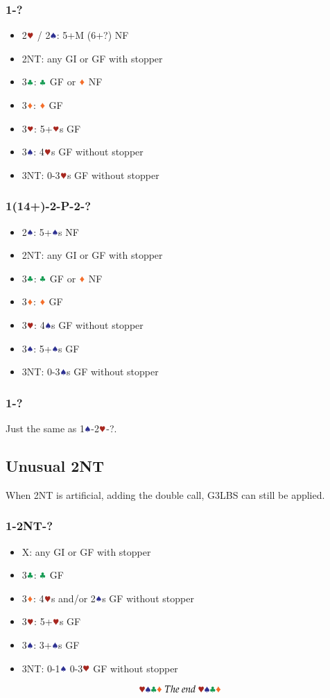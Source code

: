 \documentclass{article}
\begin{document}
\begin{multicols}{2}
\subsubsection{1\CCC-?}
\begin{itemize}
    \item 2$\hhh$ / 2$\sss$: 5+M (6+?) NF
    \item 2NT: any GI or GF with stopper
    \item 3$\ccc$: $\ccc$ GF or $\ddd$ NF
    \item 3$\ddd$: $\ddd$ GF
    \item 3$\hhh$: 5+$\hhh$s GF
    \item 3$\sss$: 4$\hhh$s GF without stopper
    \item 3NT: 0-3$\hhh$s GF without stopper
\end{itemize}

\subsubsection{1\CCC(14+)-2\CCC-P-2\HHH-?}
\begin{itemize}
    \item 2$\sss$: 5+$\sss$s NF
    \item 2NT: any GI or GF with stopper
    \item 3$\ccc$: $\ccc$ GF or $\ddd$ NF
    \item 3$\ddd$: $\ddd$ GF
    \item 3$\hhh$: 4$\sss$s GF without stopper
    \item 3$\sss$: 5+$\sss$s GF
    \item 3NT: 0-3$\sss$s GF without stopper
\end{itemize}

\subsubsection{1\SSS-?}
Just the same as 1$\sss$-2$\hhh$-?.

\subsection{Unusual 2NT}
When 2NT is artificial, adding the double call, G3LBS can still be applied.
\subsubsection{1\SSS-2NT-?}
\begin{itemize}
    \item X: any GI or GF with stopper
    \item 3$\ccc$: $\ccc$ GF
    \item 3$\ddd$: 4$\hhh$s and/or 2$\sss$s GF without stopper
    \item 3$\hhh$: 5+$\hhh$s GF
    \item 3$\sss$: 3+$\sss$s GF
    \item 3NT: 0-1$\sss$ 0-3$\hhh$ GF without stopper
\end{itemize}

$$\hhh\sss\ccc\ddd~The~end~\hhh\sss\ccc\ddd$$

\end{multicols}
\end{document}
